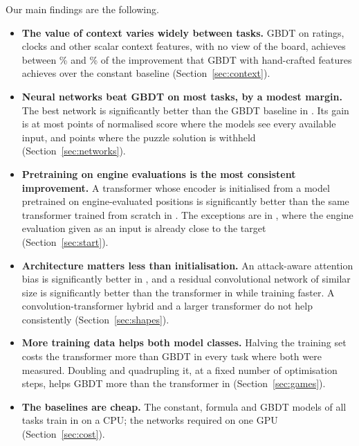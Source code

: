 \documentclass[11pt]{article}
\begin{document}
Our main findings are the following.
\begin{itemize}
\item \textbf{The value of context varies widely between tasks.} GBDT on
ratings, clocks and other scalar context features, with no view of the board,
achieves between \% and
\% of the improvement that GBDT with hand-crafted
features achieves over the constant baseline (Section~\ref{sec:context}).
\item \textbf{Neural networks beat GBDT on most tasks, by a modest margin.}
The best network is significantly better than the GBDT baseline in
. Its gain is at most
 points of normalised score where the models
see every available input, and  points where the
puzzle solution is withheld (Section~\ref{sec:networks}).
\item \textbf{Pretraining on engine evaluations is the most consistent
improvement.} A transformer whose encoder is initialised from a model
pretrained on  engine-evaluated
positions is significantly better than the same transformer trained from
scratch in . The exceptions are in
, where the engine evaluation given as
an input is already close to the target (Section~\ref{sec:start}).
\item \textbf{Architecture matters less than initialisation.} An
attack-aware attention bias is significantly better in
, and a residual convolutional network of
similar size is significantly better than the transformer in
 while training faster. A
convolution-transformer hybrid and a larger transformer do not help
consistently (Section~\ref{sec:shapes}).
\item \textbf{More training data helps both model classes.} Halving the
training set costs the transformer more than GBDT in every task where both
were measured. Doubling and quadrupling it, at a fixed number of
optimisation steps, helps GBDT more than the transformer in
 (Section~\ref{sec:games}).
\item \textbf{The baselines are cheap.} The constant, formula and GBDT
models of all  tasks train in
 on a CPU; the  networks
required  on one GPU
(Section~\ref{sec:cost}).
\end{itemize}
\end{document}
